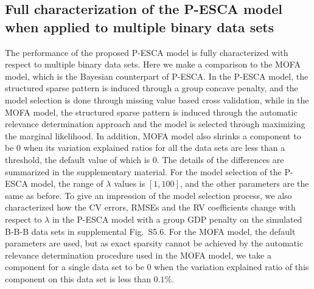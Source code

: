 \subsection{Full characterization of the P-ESCA model when applied to multiple binary data sets}
The performance of the proposed P-ESCA model is fully characterized with respect to multiple binary data sets. Here we make a comparison to the MOFA model, which is the Bayesian counterpart of P-ESCA. In the P-ESCA model, the structured sparse pattern is induced through a group concave penalty, and the model selection is done through missing value based cross validation, while in the MOFA model, the structured sparse pattern is induced through the automatic relevance determination approach and the model is selected through maximizing the marginal likelihood. In addition, MOFA model also shrinks a component to be 0 when its variation explained ratios for all the data sets are less than a threshold, the default value of which is 0. The details of the differences are summarized in the supplementary material. For the model selection of the P-ESCA model, the range of $\lambda$ values is $[1,100]$, and the other parameters are the same as before. To give an impression of the model selection process, we also characterized how the CV errors, RMSEs and the RV coefficients change with respect to $\lambda$ in the P-ESCA model with a group GDP penalty on the simulated B-B-B data sets in supplemental Fig.~S5.6. For the MOFA model, the default parameters are used, but as exact sparsity cannot be achieved by the automatic relevance determination procedure used in the MOFA model, we take a component for a single data set to be 0 when the variation explained ratio of this component on this data set is less than $0.1\%$.

